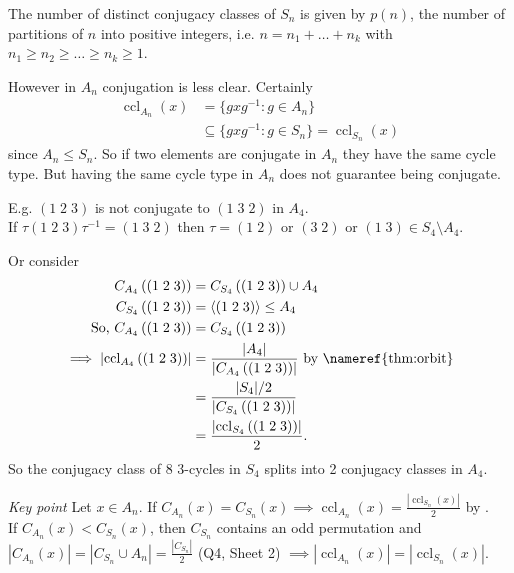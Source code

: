 \begin{corollary} \label{cor:6}
    The number of distinct conjugacy classes of $S_n$ is given by $p(n)$, the number of partitions of $n$ into positive integers, i.e. $n = n_1 + \ldots + n_k$ with $n_1 \geq n_2 \geq \ldots \geq n_k \geq 1$.
\end{corollary} 

However in $A_n$ conjugation is less clear. 
Certainly \begin{align*}
    \operatorname{ccl}_{A_n}(x) &= \{g x g^{-1} : g \in A_n\} \\
    &\subseteq \{g x g^{-1} : g \in S_n\} = \operatorname{ccl}_{S_n}(x)
\end{align*} since $A_n \leq S_n$.
So if two elements are conjugate in $A_n$ they have the same cycle type. 
But having the same cycle type in $A_n$ does not guarantee being conjugate.

E.g. $(1\; 2\; 3)$ is not conjugate to $(1\; 3\; 2)$ in $A_4$.\\
If $\tau (1\; 2\; 3) \tau^{-1} = (1\; 3\; 2)$ then $\tau = (1\; 2)$ or $(3\; 2)$ or $(1\; 3) \in S_4 \setminus A_4$.

Or consider 
\begin{align*}
    C_{A_4} \left( (1\; 2\; 3) \right) &= C_{S_4} \left( (1\; 2\; 3) \right) \cup A_4 \\
    C_{S_4} \left( (1\; 2\; 3) \right) &= \langle (1\; 2\; 3) \rangle \leq A_4 \\
    \text{So, } C_{A_4} \left( (1\; 2\; 3) \right) &= C_{S_4} \left( (1\; 2\; 3) \right) \\
    \implies \left| \operatorname{ccl}_{A_4} \left( (1\; 2\; 3) \right) \right| &= \frac{|A_4|}{\left| C_{A_4} \left( (1\; 2\; 3) \right) \right|} \text{ by \nameref{thm:orbit}} \\
    &= \frac{|S_4| / 2}{\left| C_{S_4} \left( (1\; 2\; 3) \right) \right|} \\
    &= \frac{\left| \operatorname{ccl}_{S_4} \left( (1\; 2\; 3) \right) \right|}{2}.
\end{align*} 
So the conjugacy class of 8 $3$-cycles in $S_4$ splits into 2 conjugacy classes in $A_4$.

\emph{Key point} Let $x \in A_n$.
If $C_{A_n}(x) = C_{S_n}(x) \implies \operatorname{ccl}_{A_n}(x) = \frac{| \operatorname{ccl}_{S_n}(x) |}{2}$ by . \\
If $C_{A_n}(x) < C_{S_n}(x)$, then $C_{S_n}$ contains an odd permutation and $|C_{A_n}(x)| = |C_{S_n} \cup A_n| = \frac{|C_{S_n}|}{2}$ (Q4, Sheet 2) $\implies |\operatorname{ccl}_{A_n}(x)| = |\operatorname{ccl}_{S_n}(x)|$.

